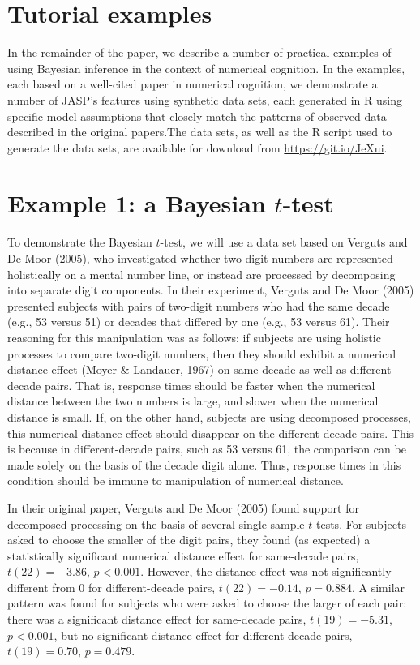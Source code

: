 \documentclass[english,,doc,floatsintext]{apa6}
\begin{document}
\hypertarget{tutorial-examples}{%
\section{Tutorial examples}\label{tutorial-examples}}

In the remainder of the paper, we describe a number of practical examples of using Bayesian inference in the context of numerical cognition. In the examples, each based on a well-cited paper in numerical cognition, we demonstrate a number of JASP's features using synthetic data sets, each generated in R using specific model assumptions that closely match the patterns of observed data described in the original papers.The data sets, as well as the R script used to generate the data sets, are available for download from \url{https://git.io/JeXui}.

\hypertarget{example-1-a-bayesian-t-test}{%
\section{\texorpdfstring{Example 1: a Bayesian \(t\)-test}{Example 1: a Bayesian t-test}}\label{example-1-a-bayesian-t-test}}

To demonstrate the Bayesian \(t\)-test, we will use a data set based on Verguts and De Moor (2005), who investigated whether two-digit numbers are represented holistically on a mental number line, or instead are processed by decomposing into separate digit components. In their experiment, Verguts and De Moor (2005) presented subjects with pairs of two-digit numbers who had the same decade (e.g., 53 versus 51) or decades that differed by one (e.g., 53 versus 61). Their reasoning for this manipulation was as follows: if subjects are using holistic processes to compare two-digit numbers, then they should exhibit a numerical distance effect (Moyer \& Landauer, 1967) on same-decade as well as different-decade pairs. That is, response times should be faster when the numerical distance between the two numbers is large, and slower when the numerical distance is small. If, on the other hand, subjects are using decomposed processes, this numerical distance effect should disappear on the different-decade pairs. This is because in different-decade pairs, such as 53 versus 61, the comparison can be made solely on the basis of the decade digit alone. Thus, response times in this condition should be immune to manipulation of numerical distance.

In their original paper, Verguts and De Moor (2005) found support for decomposed processing on the basis of several single sample \(t\)-tests. For subjects asked to choose the smaller of the digit pairs, they found (as expected) a statistically significant numerical distance effect for same-decade pairs, \(t(22) = -3.86\), \(p<0.001\). However, the distance effect was not significantly different from 0 for different-decade pairs, \(t(22)=-0.14\), \(p=0.884\). A similar pattern was found for subjects who were asked to choose the larger of each pair: there was a significant distance effect for same-decade pairs, \(t(19)=-5.31\), \(p<0.001\), but no significant distance effect for different-decade pairs, \(t(19)=0.70\), \(p=0.479\).
\end{document}
